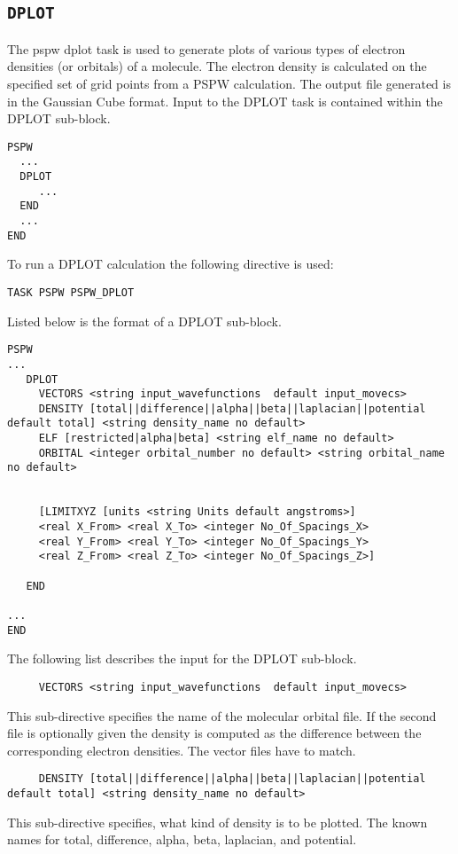 \subsection{\tt DPLOT}
\label{sec:pspw_dplot}
The pspw dplot task is used to generate plots of various types of electron
densities (or orbitals) of a molecule.  The electron density is calculated on the 
specified set of grid points from a PSPW calculation.  The output file
generated is in the Gaussian Cube format.
Input to the DPLOT task is contained
within the DPLOT sub-block.
\begin{verbatim}
PSPW
  ...
  DPLOT
     ...
  END
  ...
END
\end{verbatim}
To run a DPLOT calculation the following directive 
is used:
\begin{verbatim}
TASK PSPW PSPW_DPLOT
\end{verbatim}
Listed below is the format of a DPLOT sub-block.
\begin{verbatim}
PSPW
... 
   DPLOT
     VECTORS <string input_wavefunctions  default input_movecs>
     DENSITY [total||difference||alpha||beta||laplacian||potential default total] <string density_name no default>
     ELF [restricted|alpha|beta] <string elf_name no default>
     ORBITAL <integer orbital_number no default> <string orbital_name no default>


     [LIMITXYZ [units <string Units default angstroms>]
     <real X_From> <real X_To> <integer No_Of_Spacings_X>
     <real Y_From> <real Y_To> <integer No_Of_Spacings_Y>
     <real Z_From> <real Z_To> <integer No_Of_Spacings_Z>]

   END

...
END
\end{verbatim}

The following list describes the input for the DPLOT
sub-block.

\begin{verbatim}
     VECTORS <string input_wavefunctions  default input_movecs>  
\end{verbatim}
 This sub-directive specifies the name of the molecular orbital file. If the second file is optionally given the density is computed as the difference between the corresponding electron densities. The vector files have to match. 

\begin{verbatim}
     DENSITY [total||difference||alpha||beta||laplacian||potential default total] <string density_name no default>
\end{verbatim}
This sub-directive specifies, what kind of density is to be plotted. The known names for total, difference, alpha, beta, laplacian, and potential. 

